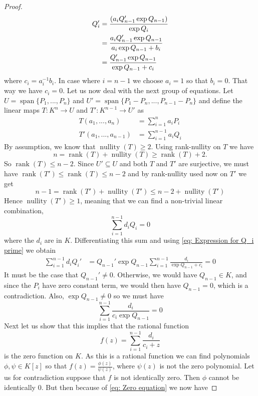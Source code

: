 \documentclass{article}
\DeclareMathOperator{\rank}{rank}
\DeclareMathOperator{\nullity}{nullity}
\newcommand{\Span}{\operatorname{span}}
\numberwithin{equation}{section}
\begin{document}
\begin{proof}
    \begin{align}\label{eq: Expression for Q_i prime}
        Q_i' & = \frac{(a_i Q_{n-1}' \exp Q_{n-1})}{\exp Q_i} \notag      \\
             & = \frac{a_i Q_{n-1}' \exp Q_{n-1}}{a_i \exp Q_{n-1} + b_i} \\
             & = \frac{Q_{n-1}' \exp Q_{n-1}}{\exp Q_{n-1} + c_i} \notag
    \end{align}
    where $c_i = a_i^{-1}b_i$. In case where $i = n-1$ we choose $a_{i} = 1$ so that $b_{i} = 0$. That way we have $c_i = 0$. Let us now deal with the next group of equations. Let $U = \Span \{P_1, ..., P_n \}$ and $U' = \Span \{P_1 - P_n, ..., P_{n-1} - P_n \}$ and define the linear maps $T : K^n \to U$ and $T' : K^{n-1} \to U'$ as
    \begin{align*}
        T(a_1, ..., a_n)      & = \sum_{i=1}^n a_i P_i     \\
        T'(a_1, ..., a_{n-1}) & = \sum_{i=1}^{n-1} a_i Q_i
    \end{align*}
    By assumption, we know that $\nullity(T) \geq 2$. Using rank-nullity on $T$ we have
    $$n = \rank(T) + \nullity(T) \geq \rank(T) + 2.$$
    So $\rank(T) \leq n-2$. Since $U' \subseteq U$ and both $T$ and $T'$ are surjective, we must have $\rank(T') \leq \rank(T) \leq n-2$ and by rank-nullity used now on $T'$ we get
    $$n-1 = \rank(T') + \nullity(T') \leq n-2 + \nullity(T')$$
    Hence $\nullity(T') \geq 1$, meaning that we can find a non-trivial linear combination,
    $$\sum_{i=1}^{n-1} d_i Q_i = 0$$
    where the $d_i$ are in $K$. Differentiating this sum and using \cref{eq: Expression for Q_i prime} we obtain
    \begin{align*}
        \sum_{i=1}^{n-1} d_i Q_i' & = Q_{n-1}' \exp Q_{n-1} \sum_{i=1}^{n-1} \frac{d_i}{\exp Q_{n-1} + c_i} = 0
    \end{align*}
    It must be the case that $Q_{n-1}' \neq 0$. Otherwise, we would have $Q_{n-1} \in K$, and since the $P_i$ have zero constant term, we would then have $Q_{n-1} = 0$, which is a contradiction. Also, $\exp Q_{n-1} \neq 0$ so we must have
    \begin{equation}\label{eq: Zero equation}
        \sum_{i=1}^{n-1} \frac{d_i}{c_i \exp Q_{n-1}} = 0
    \end{equation}
    Next let us show that this implies that the rational function
    $$f(z) = \sum_{i=1}^{n-1}\frac{d_i}{c_i + z}$$
    is the zero function on $K$. As this is a rational function we can find polynomials $\phi, \psi \in K[z]$ so that $f(z) = \frac{\phi(z)}{\psi(z)}$, where $\psi(z)$ is not the zero polynomial. Let us for contradiction suppose that $f$ is not identically zero. Then $\phi$ cannot be identically 0. But then because of \cref{eq: Zero equation} we now have

\end{proof}
\end{document}
